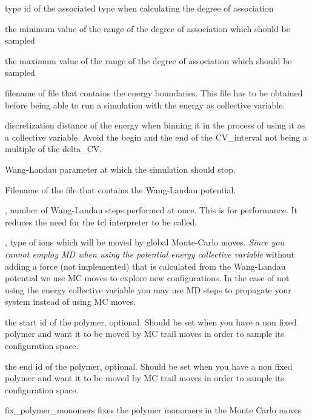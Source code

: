 \begin{arguments}
\item[\var{associated\_type}] type id of the associated type when calculating the degree of association
\item[\var{min\_value}] the minimum value of the range of the degree of association which should be sampled
\item[\var{max\_value}] the maximum value of the range of the degree of association which should be sampled
\item[\var{list\_of\_corresponding\_types}] 
\item[\var{energy\_boundary\_filename}] filename of file that contains the energy boundaries. This file has to be obtained before being able to run a simulation with the energy as collective variable.
\item[\var{Delta\_E}] discretization distance of the energy when binning it in the process of using it as a collective variable. Avoid the begin and the end of the CV\_interval not being a multiple of the delta\_CV.
\item[\var{final\_wang\_landau\_parameter}] Wang-Landau parameter at which the simulation should stop.
\item[\var{full\_path\_to\_output\_filename}] Filename of the file that contains the Wang-Landau potential.
\item[\var{wang\_landau\_setps}], number of Wang-Landau steps performed at once. This is for performance. It reduces the need for the tcl interpreter to be called.
\item[\var{counter\_ion\_type}], type of ions which will be moved by global Monte-Carlo moves. \textit{Since you cannot employ MD when using the potential energy collective variable} without adding a force (not implemented) that is calculated from the Wang-Landau potential we use MC moves to explore new configurations. In the case of not using the energy collective variable you may use MD steps to propagate your system instead of using MC moves.
\item[\var{polymer\_start\_id}] the start id of the polymer, optional. Should be set when you have a non fixed polymer and want it to be moved by MC trail moves in order to sample its configuration space.
\item[\var{polymer\_end\_id}] the end id of the polymer, optional. Should be set when you have a non fixed polymer and want it to be moved by MC trail moves in order to sample its configuration space.
\item[fix\_polymer\_monomers] fixes the polymer monomers in the Monte Carlo moves
\end{arguments}


